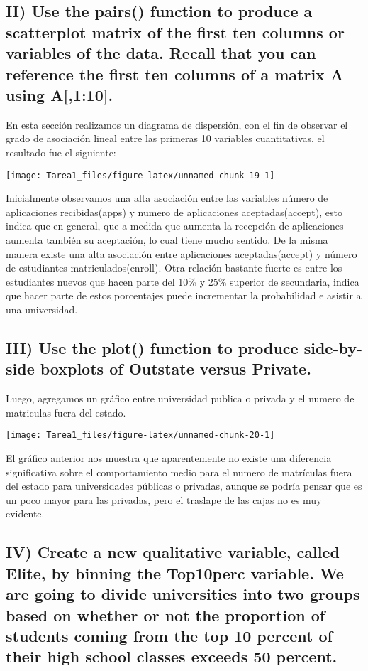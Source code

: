 \documentclass[
  12pt,
  letterpaper,
]{article}
\begin{document}
\subsection{II) Use the pairs() function to produce a scatterplot matrix of the first ten columns or variables of the data. Recall that you can reference the first ten columns of a matrix A using A[,1:10].}

En esta sección realizamos un diagrama de dispersión, con el fin de
observar el grado de asociación lineal entre las primeras 10 variables
cuantitativas, el resultado fue el siguiente:

\begin{center}\texttt{[image: Tarea1\_files/figure-latex/unnamed-chunk-19-1]} \end{center}

Inicialmente observamos una alta asociación entre las variables número
de aplicaciones recibidas(apps) y numero de aplicaciones
aceptadas(accept), esto indica que en general, que a medida que aumenta
la recepción de aplicaciones aumenta también su aceptación, lo cual
tiene mucho sentido. De la misma manera existe una alta asociación entre
aplicaciones aceptadas(accept) y número de estudiantes
matriculados(enroll). Otra relación bastante fuerte es entre los
estudiantes nuevos que hacen parte del 10\% y 25\% superior de
secundaria, indica que hacer parte de estos porcentajes puede
incrementar la probabilidad e asistir a una universidad.

\subsection{III) Use the plot() function to produce side-by-side boxplots of Outstate versus Private.}

Luego, agregamos un gráfico entre universidad publica o privada y el
numero de matriculas fuera del estado.

\begin{center}\texttt{[image: Tarea1\_files/figure-latex/unnamed-chunk-20-1]} \end{center}

El gráfico anterior nos muestra que aparentemente no existe una
diferencia significativa sobre el comportamiento medio para el numero de
matrículas fuera del estado para universidades públicas o privadas,
aunque se podría pensar que es un poco mayor para las privadas, pero el
traslape de las cajas no es muy evidente.

\subsection{IV) Create a new qualitative variable, called Elite, by binning the Top10perc variable. We are going to divide universities into two groups based on whether or not the proportion of students coming from the top 10 percent of their high school classes exceeds 50 percent.}
\end{document}
